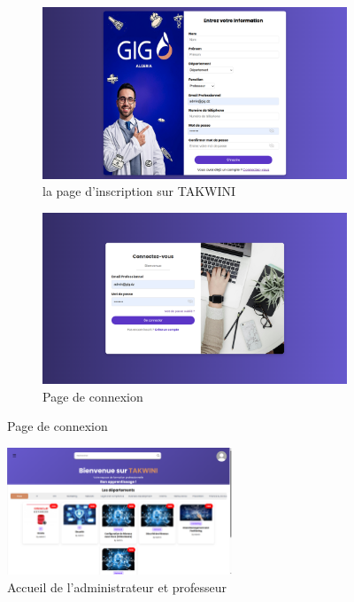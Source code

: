 \documentclass{article}
\begin{document}
\begin{figure}[H]
  \centering
  \begin{subfigure}[t]{0.4\textwidth}
    \centering
    \includegraphics[width=\textwidth]{signup.png}
    \caption{la page d’inscription sur TAKWINI}
    \label{fig:sign-up}
  \end{subfigure}
  \hspace{1cm}
  \begin{subfigure}[t]{0.4\textwidth}
    \centering
    \includegraphics[width=\textwidth]{login.png}
    \caption{Page de connexion}
    \label{fig:sign-in}
  \end{subfigure}
  \label{fig:login}
\end{figure}

\begin{figure}[H]
  \centering
  \includegraphics[width=0.6\textwidth]{dashboard.png}
  \caption{Accueil de l'administrateur et professeur}
  \label{fig:dashboard}
\end{figure}
\end{document}

